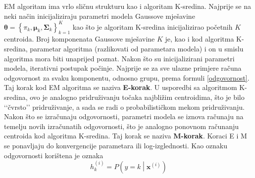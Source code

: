\documentclass[times, utf8, zavrsni]{fer}
\begin{document}
EM algoritam ima vrlo sličnu strukturu kao i algoritam K-sredina. Najprije se na neki način inicijaliziraju parametri modela Gaussove mješavine $\boldsymbol{\theta} = 
\left\{\pi_k, \boldsymbol{\mu}_k, \boldsymbol{\Sigma}_k\right\}_{k=1}^{K}$ kao što je algoritam K-sredina inicijalizirao početnih $K$ centroida. Broj komponenata Gaussove mješavine $K$ je, kao i kod algoritma K-sredina, parametar algoritma (razlikovati od parametara modela) i on u smislu algoritma mora biti unaprijed poznat. Nakon što su inicijalizirani parametri modela, iterativni postupak počinje. Najprije se za sve ulazne primjere računa odgovornost za svaku komponentu, odnosno grupu, prema formuli \ref{odgovornost}. Taj korak kod EM algoritma se naziva \textbf{E-korak}. U usporedbi sa algoritmom K-sredina, ovo je analogno pridruživanju točaka najbližim centroidima, što je bilo ‘‘čvrsto’’ pridruživanje, a sada se radi o probabilističkom mekom pridruživanju. Nakon što se izračunaju odgovornosti, parametri modela se iznova računaju na temelju novih izračunatih odgovornosti, što je analogno ponovnom računanju centroida kod algoritma K-sredina. Taj korak se naziva \textbf{M-korak}. Koraci E i M se ponavljaju do konvergencije parametara ili log-izglednosti. Kao oznaku odgovornosti korištena je oznaka
\[h_{k}^{(i)} = P \left(y = k \middle| \mathbf{x}^{(i)}\right)\]
\end{document}
